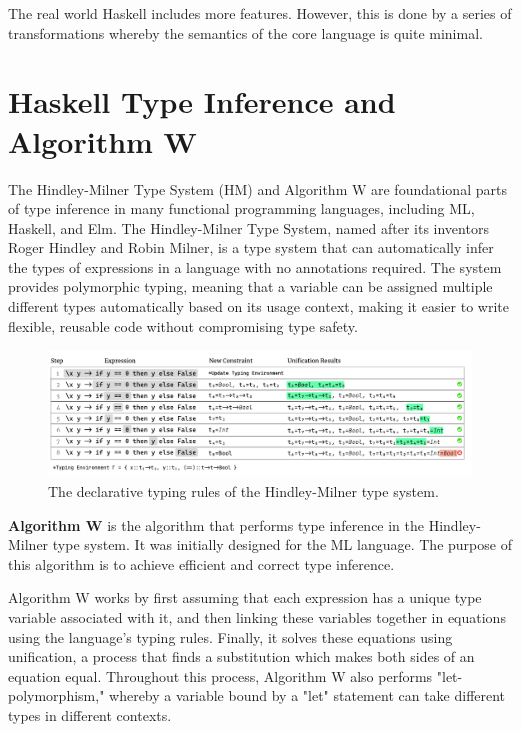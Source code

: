 The real world Haskell includes more features. However, this is done by a series of transformations whereby the semantics of the core language is quite minimal.


\section{Haskell Type Inference and Algorithm W}

The Hindley-Milner Type System (HM) and Algorithm W are foundational parts of type inference in many functional programming languages, including ML, Haskell, and Elm. The Hindley-Milner Type System, named after its inventors Roger Hindley and Robin Milner, is a type system that can automatically infer the types of expressions in a language with no annotations required. The system provides polymorphic typing, meaning that a variable can be assigned multiple different types automatically based on its usage context, making it easier to write flexible, reusable code without compromising type safety.

\begin{figure}[hbt]
    \includegraphics[width=\linewidth]{HindleyMilner}
    \caption{
        The declarative typing rules of the Hindley-Milner type system.}
\end{figure}



\textbf{Algorithm W} is the algorithm that performs type inference in the Hindley-Milner type system. It was initially designed for the ML language. The purpose of this algorithm is to achieve efficient and correct type inference.


Algorithm W works by first assuming that each expression has a unique type variable associated with it, and then linking these variables together in equations using the language's typing rules. Finally, it solves these equations using unification, a process that finds a substitution which makes both sides of an equation equal. Throughout this process, Algorithm W also performs "let-polymorphism," whereby a variable bound by a "let" statement can take different types in different contexts.


